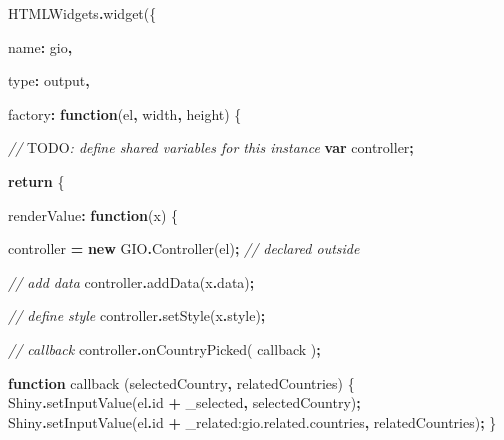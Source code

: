 \documentclass[
]{krantz}
\makeatletter
\newenvironment{Shaded}{\begin{snugshade}}{\end{snugshade}}
\newcommand{\AlertTok}[1]{\textcolor[rgb]{0.33,0.33,0.33}{#1}}
\newcommand{\AttributeTok}[1]{\textcolor[rgb]{0.61,0.61,0.61}{#1}}
\newcommand{\CommentTok}[1]{\textcolor[rgb]{0.37,0.37,0.37}{\textit{#1}}}
\newcommand{\ControlFlowTok}[1]{\textcolor[rgb]{0.27,0.27,0.27}{\textbf{#1}}}
\newcommand{\DataTypeTok}[1]{\textcolor[rgb]{0.27,0.27,0.27}{#1}}
\newcommand{\FunctionTok}[1]{\textcolor[rgb]{0,0,0}{#1}}
\newcommand{\KeywordTok}[1]{\textcolor[rgb]{0.27,0.27,0.27}{\textbf{#1}}}
\newcommand{\NormalTok}[1]{#1}
\newcommand{\OperatorTok}[1]{\textcolor[rgb]{0.43,0.43,0.43}{\textbf{#1}}}
\newcommand{\StringTok}[1]{\textcolor[rgb]{0.5,0.5,0.5}{#1}}
\newenvironment{kframe}{%
\medskip{}
\setlength{\fboxsep}{.8em}
 \def\at@end@of@kframe{}%
 \ifinner\ifhmode%
  \def\at@end@of@kframe{\end{minipage}}%
  \begin{minipage}{\columnwidth}%
 \fi\fi%
 \def\FrameCommand##1{\hskip\@totalleftmargin \hskip-\fboxsep
 \colorbox{shadecolor}{##1}\hskip-\fboxsep
     \hskip-\linewidth \hskip-\@totalleftmargin \hskip\columnwidth}%
 \MakeFramed {\advance\hsize-\width
   \@totalleftmargin\z@ \linewidth\hsize
   \@setminipage}}%
 {\par\unskip\endMakeFramed%
 \at@end@of@kframe}
\renewenvironment{Shaded}{\begin{kframe}}{\end{kframe}}
\makeatother
\begin{document}
\begin{Shaded}
\begin{Highlighting}[]
\NormalTok{HTMLWidgets}\OperatorTok{.}\FunctionTok{widget}\NormalTok{(\{}

  \DataTypeTok{name}\OperatorTok{:} \StringTok{\textquotesingle{}gio\textquotesingle{}}\OperatorTok{,}

  \DataTypeTok{type}\OperatorTok{:} \StringTok{\textquotesingle{}output\textquotesingle{}}\OperatorTok{,}

  \DataTypeTok{factory}\OperatorTok{:} \KeywordTok{function}\NormalTok{(el}\OperatorTok{,}\NormalTok{ width}\OperatorTok{,}\NormalTok{ height) \{}

    \CommentTok{// }\AlertTok{TODO}\CommentTok{: define shared variables for this instance}
    \KeywordTok{var}\NormalTok{ controller}\OperatorTok{;}

    \ControlFlowTok{return}\NormalTok{ \{}

      \DataTypeTok{renderValue}\OperatorTok{:} \KeywordTok{function}\NormalTok{(x) \{}

\NormalTok{        controller }\OperatorTok{=} \KeywordTok{new}\NormalTok{ GIO}\OperatorTok{.}\FunctionTok{Controller}\NormalTok{(el)}\OperatorTok{;} \CommentTok{// declared outside}
        
        \CommentTok{// add data}
\NormalTok{        controller}\OperatorTok{.}\FunctionTok{addData}\NormalTok{(x}\OperatorTok{.}\AttributeTok{data}\NormalTok{)}\OperatorTok{;}

        \CommentTok{// define style}
\NormalTok{        controller}\OperatorTok{.}\FunctionTok{setStyle}\NormalTok{(x}\OperatorTok{.}\AttributeTok{style}\NormalTok{)}\OperatorTok{;}

        \CommentTok{// callback}
\NormalTok{        controller}\OperatorTok{.}\FunctionTok{onCountryPicked}\NormalTok{( callback )}\OperatorTok{;}

        \KeywordTok{function}\NormalTok{ callback (selectedCountry}\OperatorTok{,}\NormalTok{ relatedCountries) \{}
\NormalTok{          Shiny}\OperatorTok{.}\FunctionTok{setInputValue}\NormalTok{(el}\OperatorTok{.}\AttributeTok{id} \OperatorTok{+} \StringTok{\textquotesingle{}\_selected\textquotesingle{}}\OperatorTok{,}\NormalTok{ selectedCountry)}\OperatorTok{;}
\NormalTok{          Shiny}\OperatorTok{.}\FunctionTok{setInputValue}\NormalTok{(el}\OperatorTok{.}\AttributeTok{id} \OperatorTok{+} \StringTok{\textquotesingle{}\_related:gio.related.countries\textquotesingle{}}\OperatorTok{,}\NormalTok{ relatedCountries)}\OperatorTok{;}
\NormalTok{        \}}


\end{Highlighting}
\end{Shaded}
\end{document}
